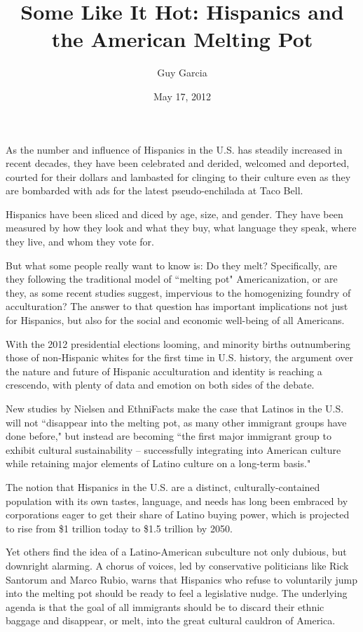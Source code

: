 \documentclass[10pt,a4paper]{article}
\newcommand{\qm}[1]{``#1"}
\begin{document}
\title{Some Like It Hot: Hispanics and the American Melting Pot}
\date{May 17, 2012}
\author{Guy Garcia}

\maketitle

\noindent\linenumbers As the number and influence of Hispanics in the U.S. has steadily increased in recent decades, they have been celebrated and derided, welcomed and deported, courted for their dollars and lambasted for clinging to their culture even as they are bombarded with ads for the latest pseudo-enchilada at Taco Bell.

Hispanics have been sliced and diced by age, size, and gender. They have been measured by how they look and what they buy, what language they speak, where they live, and whom they vote for.

But what some people really want to know is: Do they melt? Specifically, are they following the traditional model of \qm{melting pot} Americanization, or are they, as some recent studies suggest, impervious to the homogenizing foundry of acculturation? The answer to that question has important implications not just for Hispanics, but also for the social and economic well-being of all Americans.

With the 2012 presidential elections looming, and minority births outnumbering those of non-Hispanic whites for the first time in U.S. history, the argument over the nature and future of Hispanic acculturation and identity is reaching a crescendo, with plenty of data and emotion on both sides of the debate.

New studies by Nielsen and EthniFacts make the case that Latinos in the U.S. will not \qm{disappear into the melting pot, as many other immigrant groups have done before,} but instead are becoming \qm{the first major immigrant group to exhibit cultural sustainability -- successfully integrating into American culture while retaining major elements of Latino culture on a long-term basis.}

The notion that Hispanics in the U.S. are a distinct, culturally-contained population with its own tastes, language, and needs has long been embraced by corporations eager to get their share of Latino buying power, which is projected to rise from \$1 trillion today to \$1.5 trillion by 2050.

Yet others find the idea of a Latino-American subculture not only dubious, but downright alarming. A chorus of voices, led by conservative politicians like Rick Santorum and Marco Rubio, warns that Hispanics who refuse to voluntarily jump into the melting pot should be ready to feel a legislative nudge. The underlying agenda is that the goal of all immigrants should be to discard their ethnic baggage and disappear, or melt, into the great cultural cauldron of America.
\end{document}
